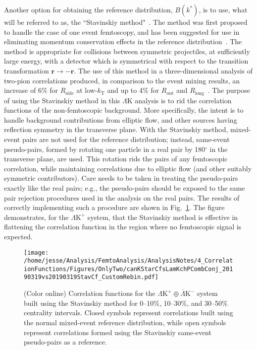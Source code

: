 \documentclass[ALICE,manyauthors]{cernphprep}
\newcommand{\LamK}{$\Lambda$K\xspace}
\newcommand{\LamKchP}{$\Lambda\mathrm{K^{+}}$\xspace}
\begin{document}
Another option for obtaining the reference distribution, $B(k^{*})$, is to use, what will be referred to as, the ``Stavinskiy method"~\cite{Stavinskiy04}.
The method was first proposed to handle the case of one event femtoscopy, and has been suggested for use in eliminating momentum conservation effects in the reference distribution~\cite{Lisa:2005dd}.
The method is appropriate for collisions between symmetric projectiles, at sufficiently large energy, with a detector which is symmetrical with respect to the {\color{red}transition} {\color{blue}transformation} $\mathbf{r} \rightarrow \mathbf{-r}$.
The use of this method in a three-dimensional analysis of two-pion correlations produced, in comparison to the event mixing results, an increase of 6\% for $R_{\mathrm{side}}$ at low-$k_{\mathrm{T}}$ and up to 4\% for $R_{\mathrm{out}}$ and $R_{\mathrm{long}}$~\cite{Aamodt:2011mr}.
The purpose of using the Stavinskiy method in this \LamK analysis is to rid the correlation functions of the non-femtoscopic background.  
More specifically, the intent is to handle background contributions from elliptic flow, and other sources having reflection symmetry in the transverse plane.  
With the Stavinskiy method, mixed-event pairs are not used for the reference distribution; instead, same-event pseudo-pairs, formed by rotating one particle in a real pair by 180$^\circ$ in the transverse plane, are used.  
This rotation rids the pairs of any femtoscopic correlation, while maintaining correlations due to elliptic flow (and other suitably symmetric contributors).
Care needs to be taken in treating the pseudo-pairs exactly like the real pairs; e.g., the pseudo-pairs should be exposed to the same pair rejection procedures used in the analysis on the real pairs.
The results of correctly implementing such a procedure are shown in Fig.~\ref{fig:StavCfs_Correct_LamKchP}.
The figure demonstrates, for the \LamKchP system, that the Stavinskiy method is effective in flattening the correlation function in the region where no femtoscopic signal is expected.

\begin{figure}[h!]
  \centering
  \texttt{[image: /home/jesse/Analysis/FemtoAnalysis/AnalysisNotes/4\_CorrelationFunctions/Figures/OnlyTwo/canKStarCfsLamKchPCombConj\_20190319vs20190319StavCf\_CustomRebin.pdf]}
  \caption[\LamKchP Stavinskiy Correlation Functions]
  {
  (Color online) Correlation functions for the $\Lambda\mathrm{K^{+}}\oplus\overline{\Lambda}\mathrm{K^{-}}$ system built using the Stavinskiy method for 0--10\%, 10--30\%, and 30--50\% centrality intervals.  Closed symbols represent correlations built using the normal mixed-event reference distribution, while open symbols represent correlations formed using the Stavinskiy same-event pseudo-pairs as a reference.
  }
  \label{fig:StavCfs_Correct_LamKchP}
\end{figure} 
\end{document}
